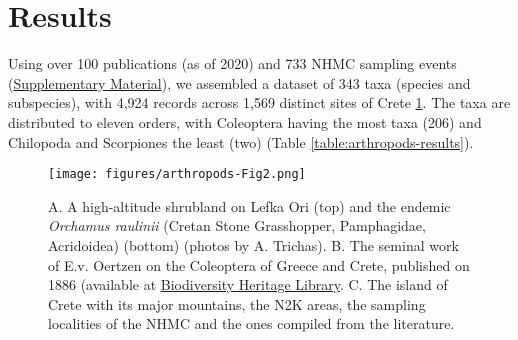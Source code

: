 \section{Results}
\label{sec:arthropods-results}

Using over 100 publications (as of 2020) and 733 NHMC sampling events
(\href{https://doi.org/10.5281/zenodo.10635645}{Supplementary Material}), we assembled a dataset of 343 taxa (species and subspecies),
with 4,924 records across 1,569 distinct sites of Crete \ref{fig:arthropods-fig2}. The taxa
are distributed to eleven orders, with Coleoptera having the most taxa (206)
and Chilopoda and Scorpiones the least (two) (Table \ref{table:arthropods-results}).

   \begin{figure}[h]
      \centering
      \texttt{[image: figures/arthropods-Fig2.png]}
      \caption[The common endemicity hotspots of all orders]{A. A high-altitude shrubland on Lefka Ori (top) and the endemic \textit{Orchamus raulinii} (Cretan Stone Grasshopper, Pamphagidae, Acridoidea) (bottom) (photos by A. Trichas). B. The seminal work of E.v. Oertzen on the Coleoptera of Greece and Crete, published on 1886 (available at \href{https://www.biodiversitylibrary.org/page/32058852}{Biodiversity Heritage Library}. C. The island of Crete with its major mountains, the N2K areas, the sampling localities of the NHMC and the ones compiled from the literature.}
      \label{fig:arthropods-fig2}
   \end{figure}



